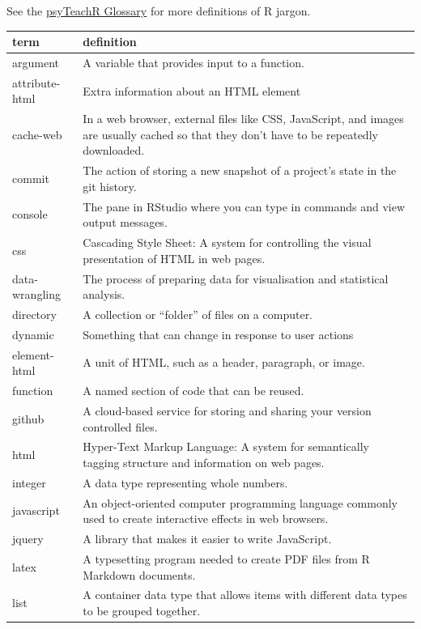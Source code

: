 \documentclass[
]{book}
\begin{document}
See the \href{https://psyteachr.github.io/glossary/}{psyTeachR Glossary} for more definitions of R jargon.

\begin{tabular}{l|l}
\hline
term & definition\\
\hline
argument & A variable that provides input to a function.\\
\hline
attribute-html & Extra information about an HTML element\\
\hline
cache-web & In a web browser, external files like CSS, JavaScript, and images are usually cached so that they don’t have to be repeatedly downloaded.\\
\hline
commit & The action of storing a new snapshot of a project’s state in the git history.\\
\hline
console & The pane in RStudio where you can type in commands and view output messages.\\
\hline
css & Cascading Style Sheet: A system for controlling the visual presentation of HTML in web pages.\\
\hline
data-wrangling & The process of preparing data for visualisation and statistical analysis.\\
\hline
directory & A collection or “folder” of files on a computer.\\
\hline
dynamic & Something that can change in response to user actions\\
\hline
element-html & A unit of HTML, such as a header, paragraph, or image.\\
\hline
function & A named section of code that can be reused.\\
\hline
github & A cloud-based service for storing and sharing your version controlled files.\\
\hline
html & Hyper-Text Markup Language: A system for semantically tagging structure and information on web pages.\\
\hline
integer & A data type representing whole numbers.\\
\hline
javascript & An object-oriented computer programming language commonly used to create interactive effects in web browsers.\\
\hline
jquery & A library that makes it easier to write JavaScript.\\
\hline
latex & A typesetting program needed to create PDF files from R Markdown documents.\\
\hline
list & A container data type that allows items with different data types to be grouped together.\\

\end{tabular}
\end{document}
